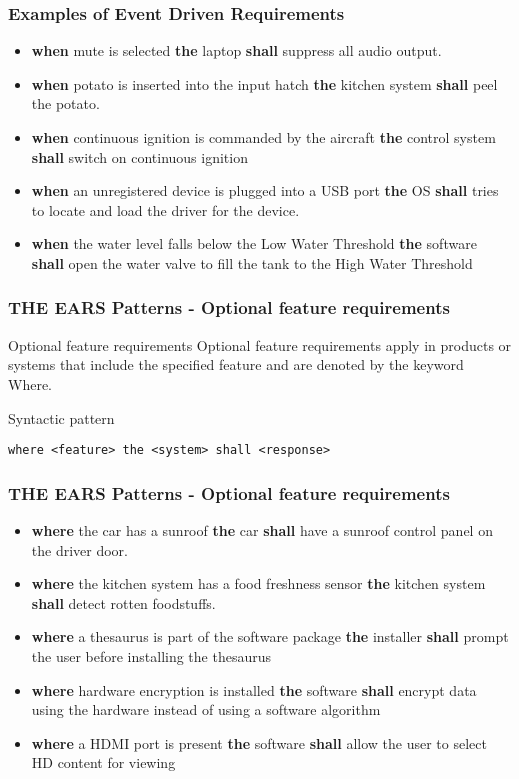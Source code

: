 \documentclass[aspectratio=169]{beamer}
\newcommand{\earse}[3]{{\bf \color{mygreen}when} {#1} {\bf \color{mypurple}the} {#2} {\bf \color{mypurple}shall} {#3}}
\newcommand{\earso}[3]{{\bf \color{mygreen}where} {#1} {\bf \color{mypurple}the} {#2} {\bf \color{mypurple}shall} {#3}}
\begin{document}
%
\begin{frame}
  \frametitle{Examples of Event Driven Requirements}
   \begin{example}
   \begin{itemize}
     \item \earse{mute is selected}{laptop}{suppress all audio output}.
     \item \earse{potato is inserted into the input hatch}{kitchen system}{peel the potato}.
     \item \earse{continuous ignition is commanded by the aircraft}{control system}{switch on
continuous ignition}
     \item \earse{an unregistered device is plugged into a USB port}{OS}{tries to locate and load the driver for the device.}
     \item \earse{the water level falls below the Low Water Threshold}{software}{open the water valve
to fill the tank to the High Water Threshold}
   \end{itemize}
   \end{example}
\end{frame}
%
%
\begin{frame}[fragile]
  \frametitle{THE EARS Patterns - Optional feature requirements}
  \begin{block}{Optional feature requirements}
   Optional feature requirements apply in products or systems that include the specified feature and are denoted by the keyword Where.
  \end{block}
  \begin{block}{Syntactic pattern}
  \begin{lstlisting}[language=EARS]
             where <feature> the <system> shall <response>
     \end{lstlisting}
   \end{block}
\end{frame}
%
\begin{frame}[fragile]
 \frametitle{THE EARS Patterns - Optional feature requirements}
 \begin{example}
  \begin{itemize}
   \item \earso{the car has a sunroof}{car}{have a sunroof control panel on the driver door}.
   \item \earso{the kitchen system has a food freshness sensor}{kitchen system}{detect rotten foodstuffs}. 
   \item \earso{a thesaurus is part of the software package}{installer}{prompt the user before installing the thesaurus}
   \item \earso{hardware encryption is installed}{software}{encrypt data using the hardware instead of using a software algorithm}
   \item \earso{a HDMI port is present}{software}{allow the user to select HD content for viewing}
  \end{itemize}
 \end{example}
\end{frame}
\end{document}
